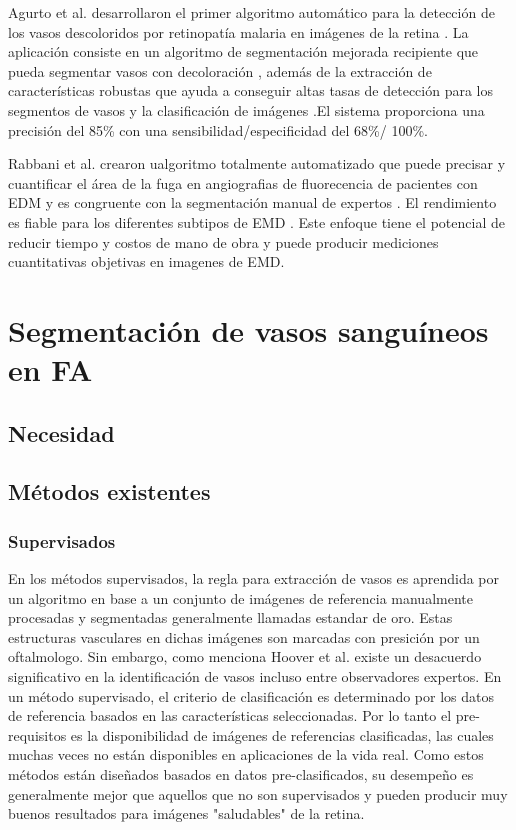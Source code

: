 Agurto et al. \cite{agurto2016vessel}  desarrollaron el primer algoritmo automático para la detección de los vasos descoloridos por retinopatía malaria en imágenes de la retina . La aplicación consiste en un algoritmo de segmentación mejorada recipiente que pueda segmentar vasos con decoloración , además de la extracción de características robustas que  ayuda a conseguir altas tasas de detección para los segmentos de vasos y la clasificación de imágenes .El sistema proporciona una precisión del 85\% con una sensibilidad/especificidad del 68\%/ 100\%. 

Rabbani et al. \cite{rabbani2015fully}  crearon ualgoritmo totalmente automatizado que puede  precisar y cuantificar el área de la fuga en angiografias de fluorecencia de pacientes con EDM y es congruente con la segmentación manual de expertos . El rendimiento es fiable para los diferentes subtipos de EMD . Este enfoque tiene el potencial de reducir tiempo y costos de mano de obra y puede producir mediciones cuantitativas objetivas en imagenes de EMD.





 

\section{Segmentaci\'on de vasos sangu\'ineos en FA}

	\subsection{Necesidad}
	

	\subsection{M\'etodos existentes}



	\subsubsection{Supervisados}

En los m\'etodos supervisados, la regla para extracci\'on de vasos es aprendida por un algoritmo en base a un conjunto de im\'agenes de referencia manualmente procesadas y segmentadas generalmente llamadas estandar de oro. Estas estructuras vasculares en dichas im\'agenes son marcadas con presici\'on por un oftalmologo. Sin embargo, como menciona Hoover et al. \cite{hoover2000locating} existe un desacuerdo significativo en la identificaci\'on de vasos incluso entre observadores expertos. En un m\'etodo supervisado, el criterio de clasificaci\'on es determinado por los datos de referencia basados en las caracter\'isticas seleccionadas. Por lo tanto el pre-requisitos es la disponibilidad de im\'agenes de referencias clasificadas, las cuales muchas veces no est\'an disponibles en aplicaciones de la vida real. Como estos m\'etodos est\'an dise\~nados basados en datos pre-clasificados, su desempeño es generalmente mejor que aquellos que no son supervisados y pueden producir muy buenos resultados para im\'agenes "saludables" de la retina.

